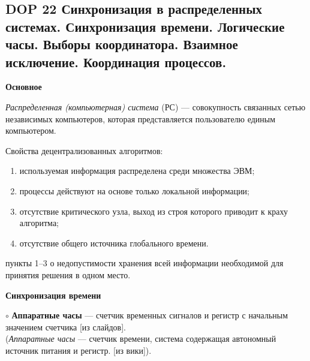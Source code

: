 \newcommand{\notsure}[1]{(видимо: #1)}
\newcommand{\aboba}[2]{\textbf{\LARGE dop #1. #2}}
\newcommand{\multicom}[1]{}
\newcommand{\lulz}[1]{}
\newcommand{\wantsayInstead}[1]{}

\subsection*{DOP 22 Синхронизация  в  распределенных  системах.  Синхронизация  времени.  Логические  часы.  Выборы координатора. Взаимное исключение. Координация процессов.}

\bigbreak

\centerline{\textbf{Основное}}

\textit{Распределенная (компьютерная) система} (РС) --– совокупность связанных
сетью независимых компьютеров, которая представляется
пользователю единым компьютером.


Свойства децентрализованных алгоритмов:
\vspace{-0.7em}
\begin{enumerate}
\setlength\itemsep{-0.4em}
\item используемая информация распределена среди множества ЭВМ;
\item процессы действуют на основе только локальной информации;
\item отсутствие критического узла, выход из строя которого приводит к краху алгоритма;
\item отсутствие общего источника глобального времени.
\end{enumerate}
пункты 1--3 о недопустимости хранения всей информации необходимой для принятия решения в одном место.


\centerline{\textbf{Синхронизация времени}}

$\circ$
\textbf{Аппаратные часы} --- счетчик временных сигналов и регистр с начальным значением счетчика [из слайдов].
\\
(\textit{Аппаратные часы} --- счетчик времени, система содержащая автономный источник питания и регистр. [из вики]).

